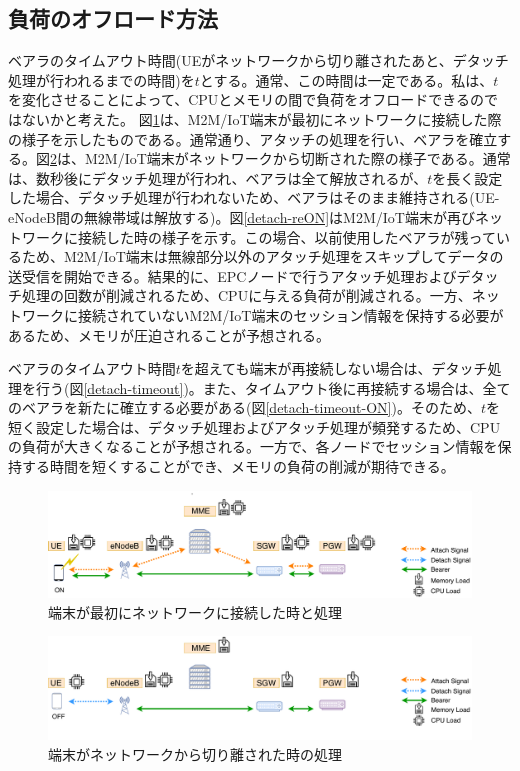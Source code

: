\documentclass[a4j]{ujarticle}
\begin{document}
\subsection{負荷のオフロード方法}
\label{sec:des}
ベアラのタイムアウト時間(UEがネットワークから切り離されたあと、デタッチ処理が行われるまでの時間)を$t$とする。通常、この時間は一定である。私は、$t$を変化させることによって、CPUとメモリの間で負荷をオフロードできるのではないかと考えた。
図\ref{detach-ON}は、M2M/IoT端末が最初にネットワークに接続した際の様子を示したものである。通常通り、アタッチの処理を行い、ベアラを確立する。図\ref{detach-OFF}は、M2M/IoT端末がネットワークから切断された際の様子である。通常は、数秒後にデタッチ処理が行われ、ベアラは全て解放されるが、$t$を長く設定した場合、デタッチ処理が行われないため、ベアラはそのまま維持される(UE-eNodeB間の無線帯域は解放する)。図\ref{detach-reON}はM2M/IoT端末が再びネットワークに接続した時の様子を示す。この場合、以前使用したベアラが残っているため、M2M/IoT端末は無線部分以外のアタッチ処理をスキップしてデータの送受信を開始できる。結果的に、EPCノードで行うアタッチ処理およびデタッチ処理の回数が削減されるため、CPUに与える負荷が削減される。一方、ネットワークに接続されていないM2M/IoT端末のセッション情報を保持する必要があるため、メモリが圧迫されることが予想される。

ベアラのタイムアウト時間$t$を超えても端末が再接続しない場合は、デタッチ処理を行う(図\ref{detach-timeout})。また、タイムアウト後に再接続する場合は、全てのベアラを新たに確立する必要がある(図\ref{detach-timeout-ON})。そのため、$t$を短く設定した場合は、デタッチ処理およびアタッチ処理が頻発するため、CPUの負荷が大きくなることが予想される。一方で、各ノードでセッション情報を保持する時間を短くすることができ、メモリの負荷の削減が期待できる。



\begin{figure}[htbp]
	\centering
	\includegraphics[width=0.7\hsize]{detach-ON.pdf}
  \caption{端末が最初にネットワークに接続した時と処理}
	\label{detach-ON}
\end{figure}

\begin{figure}[htbp]
	\centering
	\includegraphics[width=0.7\hsize]{detach-OFF.pdf}
  \caption{端末がネットワークから切り離された時の処理}
	\label{detach-OFF}
\end{figure}
\end{document}
